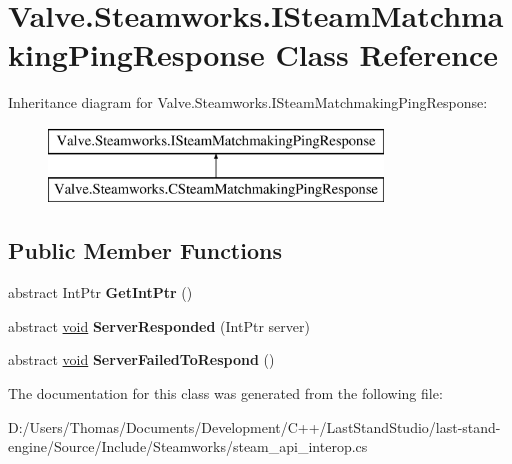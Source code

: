 \hypertarget{classValve_1_1Steamworks_1_1ISteamMatchmakingPingResponse}{}\section{Valve.\+Steamworks.\+I\+Steam\+Matchmaking\+Ping\+Response Class Reference}
\label{classValve_1_1Steamworks_1_1ISteamMatchmakingPingResponse}
Inheritance diagram for Valve.\+Steamworks.\+I\+Steam\+Matchmaking\+Ping\+Response\+:\begin{figure}[H]
\begin{center}
\leavevmode
\includegraphics[height=2.000000cm]{classValve_1_1Steamworks_1_1ISteamMatchmakingPingResponse}
\end{center}
\end{figure}
\subsection*{Public Member Functions}
\begin{DoxyCompactItemize}
\item 
\hypertarget{classValve_1_1Steamworks_1_1ISteamMatchmakingPingResponse_aea9bf1546f658a3dd7ea97ebcca4516e}{}abstract Int\+Ptr {\bfseries Get\+Int\+Ptr} ()\label{classValve_1_1Steamworks_1_1ISteamMatchmakingPingResponse_aea9bf1546f658a3dd7ea97ebcca4516e}

\item 
\hypertarget{classValve_1_1Steamworks_1_1ISteamMatchmakingPingResponse_a2f0dedcbca0fb74b30033c881528baff}{}abstract \hyperlink{SDL__audio_8h_a52835ae37c4bb905b903cbaf5d04b05f}{void} {\bfseries Server\+Responded} (Int\+Ptr server)\label{classValve_1_1Steamworks_1_1ISteamMatchmakingPingResponse_a2f0dedcbca0fb74b30033c881528baff}

\item 
\hypertarget{classValve_1_1Steamworks_1_1ISteamMatchmakingPingResponse_a001ef9f38ad2d59400af77ec2a259087}{}abstract \hyperlink{SDL__audio_8h_a52835ae37c4bb905b903cbaf5d04b05f}{void} {\bfseries Server\+Failed\+To\+Respond} ()\label{classValve_1_1Steamworks_1_1ISteamMatchmakingPingResponse_a001ef9f38ad2d59400af77ec2a259087}

\end{DoxyCompactItemize}


The documentation for this class was generated from the following file\+:\begin{DoxyCompactItemize}
\item 
D\+:/\+Users/\+Thomas/\+Documents/\+Development/\+C++/\+Last\+Stand\+Studio/last-\/stand-\/engine/\+Source/\+Include/\+Steamworks/steam\+\_\+api\+\_\+interop.\+cs\end{DoxyCompactItemize}
